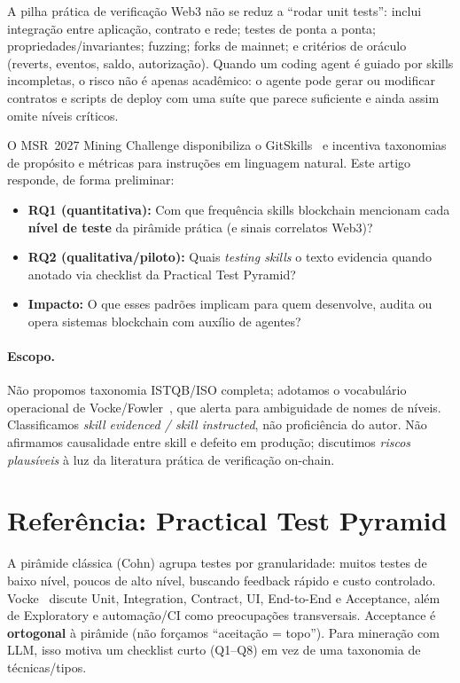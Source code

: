 \documentclass[10pt,conference]{IEEEtran}
\begin{document}
A pilha prática de verificação Web3 não se reduz a ``rodar unit tests'': inclui integração entre aplicação, contrato e rede; testes de ponta a ponta; propriedades/invariantes; fuzzing; forks de mainnet; e critérios de oráculo (reverts, eventos, saldo, autorização).
Quando um coding agent é guiado por skills incompletas, o risco não é apenas acadêmico: o agente pode gerar ou modificar contratos e scripts de deploy com uma suíte que parece suficiente e ainda assim omite níveis críticos.

O MSR~2027 Mining Challenge disponibiliza o GitSkills~\cite{gitskills2027} e incentiva taxonomias de propósito e métricas para instruções em linguagem natural.
Este artigo responde, de forma preliminar:

\begin{itemize}[leftmargin=*,itemsep=1pt]
\item \textbf{RQ1 (quantitativa):} Com que frequência skills blockchain mencionam cada \textbf{nível de teste} da pirâmide prática (e sinais correlatos Web3)?
\item \textbf{RQ2 (qualitativa/piloto):} Quais \emph{testing skills} o texto evidencia quando anotado via checklist da Practical Test Pyramid?
\item \textbf{Impacto:} O que esses padrões implicam para quem desenvolve, audita ou opera sistemas blockchain com auxílio de agentes?
\end{itemize}

\paragraph{Escopo.}
Não propomos taxonomia ISTQB/ISO completa; adotamos o vocabulário operacional de Vocke/Fowler~\cite{vocke2018pyramid}, que alerta para ambiguidade de nomes de níveis.
Classificamos \emph{skill evidenced / skill instructed}, não proficiência do autor.
Não afirmamos causalidade entre skill e defeito em produção; discutimos \emph{riscos plausíveis} à luz da literatura prática de verificação on-chain.

\section{Referência: Practical Test Pyramid}

A pirâmide clássica (Cohn) agrupa testes por granularidade: muitos testes de baixo nível, poucos de alto nível, buscando feedback rápido e custo controlado.
Vocke~\cite{vocke2018pyramid} discute Unit, Integration, Contract, UI, End-to-End e Acceptance, além de Exploratory e automação/CI como preocupações transversais.
Acceptance é \textbf{ortogonal} à pirâmide (não forçamos ``aceitação = topo'').
Para mineração com LLM, isso motiva um checklist curto (Q1--Q8) em vez de uma taxonomia de técnicas/tipos.
\end{document}
